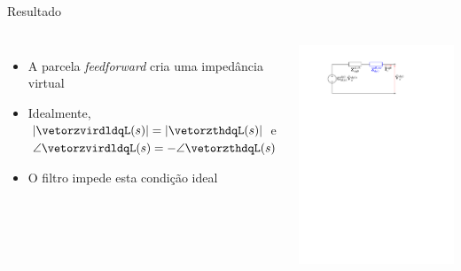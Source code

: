 \begin{frame}{Resultado}


\begin{columns}

\centering

\begin{itemize}
	\item A parcela {\it feedforward} cria uma impedância virtual\\[15pt]
	
	\item Idealmente,\\[5pt] $|\vetorzvirdldqL(s)| = |\vetorzthdqL(s)|$ e\\[5pt] $\angle \vetorzvirdldqL(s) = - \angle \vetorzthdqL(s) $\\[15pt]
	
	\item O filtro impede esta condição ideal
\end{itemize}

\centering

\includegraphics[width=0.9\linewidth]{./figuras/figuras_enhanced/Thevenin_SRF_VI_Zvir}




\end{columns}
\end{frame}
